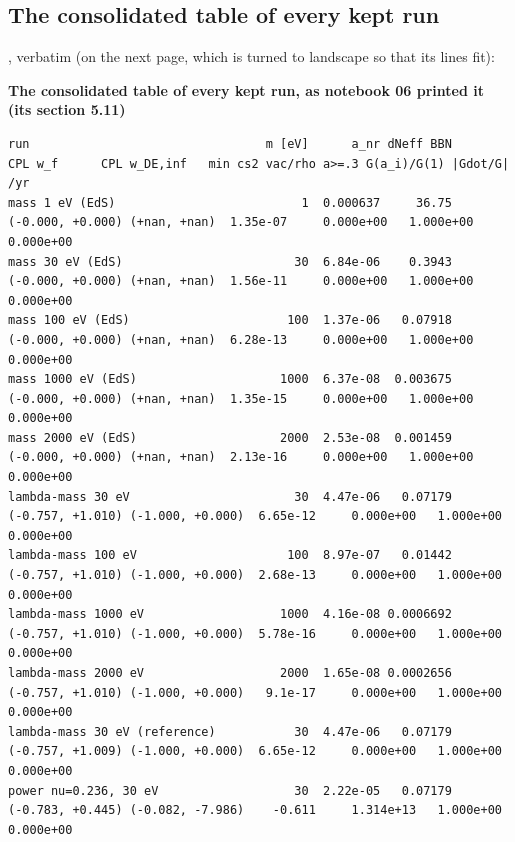 \subsection{The consolidated table of every kept run}
\label{sec:9.13}

,
verbatim (on the next page, which is turned to landscape so that its lines fit):

\begin{landscape}
\begin{center}
\small\textbf{The consolidated table of every kept run, as notebook 06 printed it (its section 5.11)}
\end{center}
\begin{Verbatim}[fontsize=\scriptsize,xleftmargin=0pt]
run                                 m [eV]      a_nr dNeff BBN           CPL w_f      CPL w_DE,inf   min cs2 vac/rho a>=.3 G(a_i)/G(1) |Gdot/G| /yr
mass 1 eV (EdS)                          1  0.000637     36.75 (-0.000, +0.000) (+nan, +nan)  1.35e-07     0.000e+00   1.000e+00    0.000e+00
mass 30 eV (EdS)                        30  6.84e-06    0.3943 (-0.000, +0.000) (+nan, +nan)  1.56e-11     0.000e+00   1.000e+00    0.000e+00
mass 100 eV (EdS)                      100  1.37e-06   0.07918 (-0.000, +0.000) (+nan, +nan)  6.28e-13     0.000e+00   1.000e+00    0.000e+00
mass 1000 eV (EdS)                    1000  6.37e-08  0.003675 (-0.000, +0.000) (+nan, +nan)  1.35e-15     0.000e+00   1.000e+00    0.000e+00
mass 2000 eV (EdS)                    2000  2.53e-08  0.001459 (-0.000, +0.000) (+nan, +nan)  2.13e-16     0.000e+00   1.000e+00    0.000e+00
lambda-mass 30 eV                       30  4.47e-06   0.07179 (-0.757, +1.010) (-1.000, +0.000)  6.65e-12     0.000e+00   1.000e+00    0.000e+00
lambda-mass 100 eV                     100  8.97e-07   0.01442 (-0.757, +1.010) (-1.000, +0.000)  2.68e-13     0.000e+00   1.000e+00    0.000e+00
lambda-mass 1000 eV                   1000  4.16e-08 0.0006692 (-0.757, +1.010) (-1.000, +0.000)  5.78e-16     0.000e+00   1.000e+00    0.000e+00
lambda-mass 2000 eV                   2000  1.65e-08 0.0002656 (-0.757, +1.010) (-1.000, +0.000)   9.1e-17     0.000e+00   1.000e+00    0.000e+00
lambda-mass 30 eV (reference)           30  4.47e-06   0.07179 (-0.757, +1.009) (-1.000, +0.000)  6.65e-12     0.000e+00   1.000e+00    0.000e+00
power nu=0.236, 30 eV                   30  2.22e-05   0.07179 (-0.783, +0.445) (-0.082, -7.986)    -0.611     1.314e+13   1.000e+00    0.000e+00

\end{Verbatim}
\end{landscape}
